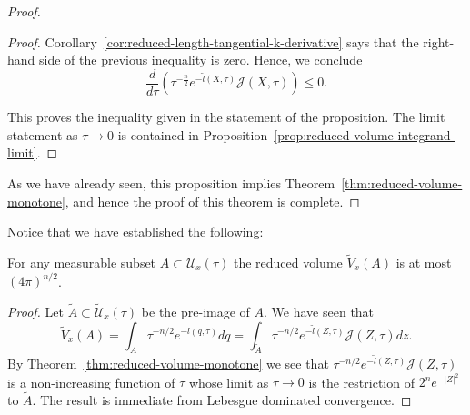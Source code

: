 \begin{proof}
\begin{proof}
Corollary~\ref{cor:reduced-length-tangential-k-derivative} says that the right-hand side of the
previous inequality is zero. Hence, we conclude
\begin{equation}\label{Jineq}
\frac{d}{d\tau}\left(\tau^{-\frac{n}{2}}e^{-\tilde
l(X,\tau)}{\mathcal J}(X,\tau)\right)\le 0. \end{equation}

This proves the inequality given in the statement of the
proposition. The limit statement as $\tau\rightarrow 0$ is contained
in Proposition~\ref{prop:reduced-volume-integrand-limit}.
\end{proof}

As we have already seen, this proposition implies
 Theorem~\ref{thm:reduced-volume-monotone}, and hence the proof of this theorem is complete.
\end{proof}

Notice that we have established the following:


\begin{corollary}\label{cor:reduced-volume-bounded}
\label{finiteredvol}
For any measurable subset $A\subset {\mathcal U}_x(\tau)$ the
reduced volume  $\widetilde V_x(A)$ is at most $(4\pi)^{n/2}$.
\end{corollary}


\begin{proof}
Let $\widetilde A\subset \widetilde {\mathcal U}_x(\tau)$ be the pre-image
of $A$. We have seen that
$$\widetilde V_x(A)=\int_{A}\tau^{-n/2}e^{-l(q,\tau)}dq=\int_{\widetilde
A}\tau^{-n/2}e^{-\tilde l(Z,\tau)}{\mathcal J}(Z,\tau)dz.$$ By
Theorem~\ref{thm:reduced-volume-monotone} we see that $\tau^{-n/2}e^{-\tilde
l(Z,\tau)}{\mathcal J}(Z,\tau)$ is a non-increasing function of
$\tau$ whose limit as $\tau\rightarrow 0$ is the restriction of
$2^ne^{-|Z|^2}$ to $\widetilde A$. The result is immediate from
Lebesgue dominated convergence.
\end{proof}





